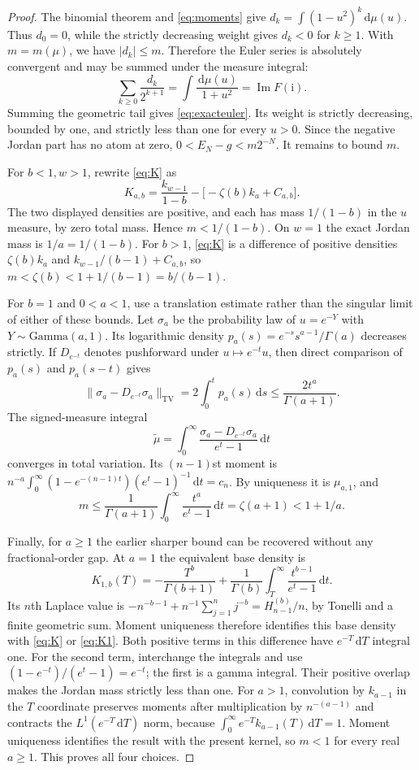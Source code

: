 \documentclass[11pt]{article}
\numberwithin{equation}{section}
\theoremstyle{definition}\newtheorem{definition}[theorem]{Definition}
\theoremstyle{remark}\newtheorem{remark}[theorem]{Remark}
\newcommand{\dd}{\,\mathrm d}
\newcommand{\ii}{\mathrm i}
\DeclareMathOperator{\Impart}{Im}
\begin{document}
\begin{proof}
The binomial theorem and \eqref{eq:moments} give
$d_k=\int(1-u^2)^k\dd\mu(u)$. Thus $d_0=0$, while the strictly
decreasing weight gives $d_k<0$ for $k\ge1$. With
$m=m(\mu)$, we have $|d_k|\le m$. Therefore the Euler series is
absolutely convergent and may be summed under the measure integral:
\[
 \sum_{k\ge0}\frac{d_k}{2^{k+1}}
 =\int\frac{\dd\mu(u)}{1+u^2}=\Impart F(\ii).
\]
Summing the geometric tail gives \eqref{eq:exacteuler}. Its weight
is strictly decreasing, bounded by one, and strictly less than one
for every $u>0$. Since the negative Jordan part has no atom at zero,
$0<E_N-g<m2^{-N}$. It remains to bound $m$.

For $b<1,w>1$, rewrite \eqref{eq:K} as
\[
 K_{a,b}=\frac{k_{w-1}}{1-b}
          -\bigl[-\zeta(b)k_a+C_{a,b}\bigr].
\]
The two displayed densities are positive, and each has mass
$1/(1-b)$ in the $u$ measure, by zero total mass. Hence
$m<1/(1-b)$. On $w=1$ the exact Jordan mass is $1/a=1/(1-b)$.
For $b>1$, \eqref{eq:K} is a difference of positive densities
$\zeta(b)k_a$ and $k_{w-1}/(b-1)+C_{a,b}$, so
$m<\zeta(b)<1+1/(b-1)=b/(b-1)$.

For $b=1$ and $0<a<1$, use a translation estimate rather than the
singular limit of either of these bounds. Let $\sigma_a$ be the
probability law of $u=e^{-Y}$ with $Y\sim\mathrm{Gamma}(a,1)$.
Its logarithmic density $p_a(s)=e^{-s}s^{a-1}/\Gamma(a)$ decreases
strictly. If $D_{e^{-t}}$ denotes pushforward under $u\mapsto e^{-t}u$,
then direct comparison of $p_a(s)$ and $p_a(s-t)$ gives
\[
 \|\sigma_a-D_{e^{-t}}\sigma_a\|_{\mathrm{TV}}
 =2\int_0^tp_a(s)\dd s
 \le\frac{2t^a}{\Gamma(a+1)}.
\]
The signed-measure integral
\[
 \widetilde\mu=\int_0^\infty
       \frac{\sigma_a-D_{e^{-t}}\sigma_a}{e^t-1}\dd t
\]
converges in total variation. Its $(n-1)$st moment is
$n^{-a}\int_0^\infty(1-e^{-(n-1)t})(e^t-1)^{-1}\dd t=c_n$.
By uniqueness it is $\mu_{a,1}$, and
\[
 m\le\frac1{\Gamma(a+1)}\int_0^\infty\frac{t^a}{e^t-1}\dd t
 =\zeta(a+1)<1+1/a.
\]

Finally, for $a\ge1$ the earlier sharper bound can be recovered
without any fractional-order gap. At $a=1$ the equivalent base density is
\[
 K_{1,b}(T)=-\frac{T^b}{\Gamma(b+1)}
 +\frac1{\Gamma(b)}\int_T^\infty\frac{t^{b-1}}{e^t-1}\dd t.
\]
Its $n$th Laplace value is
$-n^{-b-1}+n^{-1}\sum_{j=1}^n j^{-b}=H_{n-1}^{(b)}/n$,
by Tonelli and a finite geometric sum. Moment uniqueness therefore
identifies this base density with \eqref{eq:K} or \eqref{eq:K1}.
Both positive terms in this difference have $e^{-T}\dd T$ integral
one. For the second term, interchange the integrals and use
$(1-e^{-t})/(e^t-1)=e^{-t}$; the first is a gamma integral.
Their positive overlap makes the Jordan mass strictly less than one.
For $a>1$, convolution by $k_{a-1}$ in the $T$ coordinate preserves
moments after multiplication by $n^{-(a-1)}$ and contracts the
$L^1(e^{-T}\dd T)$ norm, because
$\int_0^\infty e^{-T}k_{a-1}(T)\dd T=1$.
Moment uniqueness identifies the result with the present kernel,
so $m<1$ for every real $a\ge1$. This proves all four choices.
\end{proof}
\end{document}
